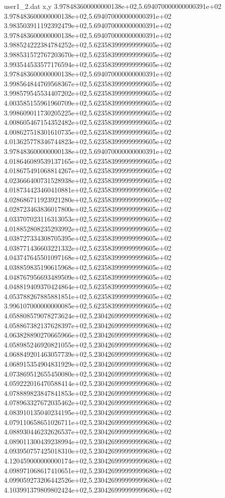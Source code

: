 \begin{filecontents}{user1_2.dat}
x,y
3.978483600000000138e+02,5.694070000000000391e+02
3.978483600000000138e+02,5.694070000000000391e+02
3.983503911192392479e+02,5.694070000000000391e+02
3.978483600000000138e+02,5.694070000000000391e+02
3.988524222384784252e+02,5.623583999999999605e+02
3.988531572767203670e+02,5.623583999999999605e+02
3.993544533577176594e+02,5.623583999999999605e+02
3.978483600000000138e+02,5.694070000000000391e+02
3.998564844769568367e+02,5.623583999999999605e+02
3.998579545534407202e+02,5.623583999999999605e+02
4.003585155961960709e+02,5.623583999999999605e+02
3.998609011730205225e+02,5.623583999999999605e+02
4.008605467154352482e+02,5.623583999999999605e+02
4.008627518301610735e+02,5.623583999999999605e+02
4.013625778346744823e+02,5.623583999999999605e+02
3.978483600000000138e+02,5.694070000000000391e+02
4.018646089539137165e+02,5.623583999999999605e+02
4.018675491068814267e+02,5.623583999999999605e+02
4.023666400731528938e+02,5.623583999999999605e+02
4.018734423460410881e+02,5.623583999999999605e+02
4.028686711923921280e+02,5.623583999999999605e+02
4.028723463836017800e+02,5.623583999999999605e+02
4.033707023116313053e+02,5.623583999999999605e+02
4.018852808235293992e+02,5.623583999999999605e+02
4.038727334308705395e+02,5.623583999999999605e+02
4.038771436603221332e+02,5.623583999999999605e+02
4.043747645501097168e+02,5.623583999999999605e+02
4.038859835190615968e+02,5.623583999999999605e+02
4.048767956693489509e+02,5.623583999999999605e+02
4.048819409370424864e+02,5.623583999999999605e+02
4.053788267885881851e+02,5.623583999999999605e+02
3.996107000000000085e+02,5.623583999999999605e+02
4.058808579078273624e+02,5.230426999999999680e+02
4.058867382137628397e+02,5.230426999999999680e+02
4.063828890270665966e+02,5.230426999999999680e+02
4.058985246920821055e+02,5.230426999999999680e+02
4.068849201463057739e+02,5.230426999999999680e+02
4.068915354904831929e+02,5.230426999999999680e+02
4.073869512655450080e+02,5.230426999999999680e+02
4.059222016470588414e+02,5.230426999999999680e+02
4.078889823847841853e+02,5.230426999999999680e+02
4.078963327672035462e+02,5.230426999999999680e+02
4.083910135040234195e+02,5.230426999999999680e+02
4.079110658651026711e+02,5.230426999999999680e+02
4.088930446232626537e+02,5.230426999999999680e+02
4.089011300439238994e+02,5.230426999999999680e+02
4.093950757425018310e+02,5.230426999999999680e+02
4.120459000000000174e+02,5.230426999999999680e+02
4.098971068617410651e+02,5.230426999999999680e+02
4.099059273206442526e+02,5.230426999999999680e+02
4.103991379809802424e+02,5.230426999999999680e+02

\end{filecontents}
